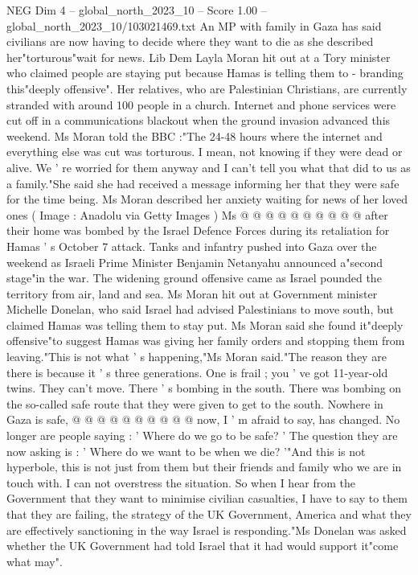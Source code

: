 \begin{textsample}{NEG Dim 4 – global\_north\_2023\_10 – Score 1.00 – global\_north\_2023\_10/103021469.txt}  \label{ex:f4_neg_018}
An MP with family in Gaza has said civilians are now having to decide where they want to die as she described her"torturous"wait for news.
Lib Dem Layla Moran hit out at a Tory minister who claimed people are staying put because Hamas is telling them to - branding this"deeply offensive".
Her relatives, who are Palestinian Christians, are currently stranded with around 100 people in a church.
Internet and phone services were cut off in a communications blackout when the ground invasion advanced this weekend.
Ms Moran told the BBC :"The 24-48 hours where the internet and everything else was cut was torturous.
I mean, not knowing if they were dead or alive.
We ' re worried for them anyway and I can't tell you what that did to us as a family."She said she had received a message informing her that they were safe for the time being.
Ms Moran described her anxiety waiting for news of her loved ones ( Image : Anadolu via Getty Images ) Ms @ @ @ @ @ @ @ @ @ @ after their home was bombed by the Israel Defence Forces during its retaliation for Hamas ' s October 7 attack.
Tanks and infantry pushed into Gaza over the weekend as Israeli Prime Minister Benjamin Netanyahu announced a"second stage"in the war.
The widening ground offensive came as Israel pounded the territory from air, land and sea.
Ms Moran hit out at Government minister Michelle Donelan, who said Israel had advised Palestinians to move south, but claimed Hamas was telling them to stay put.
Ms Moran said she found it"deeply offensive"to suggest Hamas was giving her family orders and stopping them from leaving."This is not what ' s happening,"Ms Moran said."The reason they are there is because it ' s three generations.
One is frail ; you ' ve got 11-year-old twins.
They can't move.
There ' s bombing in the south.
There was bombing on the so-called safe route that they were given to get to the south.
Nowhere in Gaza is safe, @ @ @ @ @ @ @ @ @ @ now, I ' m afraid to say, has changed.
No longer are people saying : ' Where do we go to be safe? ' The question they are now asking is : ' Where do we want to be when we die? '"And this is not hyperbole, this is not just from them but their friends and family who we are in touch with.
I can not overstress the situation.
So when I hear from the Government that they want to minimise civilian casualties, I have to say to them that they are failing, the strategy of the UK Government, America and what they are effectively sanctioning in the way Israel is responding."Ms Donelan was asked whether the UK Government had told Israel that it had would support it"come what may".

\end{textsample}
